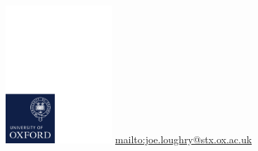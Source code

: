 \documentclass{beamer}
\begin{document}
\begin{frame}
	\begin{center}
		\vspace{1cm}
		\includegraphics[width=0.3\textwidth,trim=0 0 117mm 183mm,clip]{ox_brand_cmyk_pos.pdf}
		\vfill
		\url{mailto:joe.loughry@stx.ox.ac.uk}
	\end{center}
\end{frame}
\end{document}
